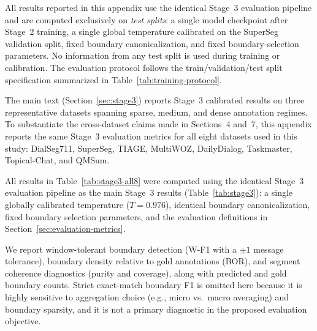 All results reported in this appendix use the identical Stage~3 evaluation pipeline
and are computed exclusively on \emph{test splits}:
a single model checkpoint after Stage~2 training,
a single global temperature calibrated on the SuperSeg validation split,
fixed boundary canonicalization,
and fixed boundary-selection parameters.
No information from any test split is used during training or calibration.
The evaluation protocol follows the train/validation/test split specification
summarized in Table~\ref{tab:training-protocol}.

The main text (Section~\ref{sec:stage3}) reports Stage~3 calibrated results on three
representative datasets spanning sparse, medium, and dense annotation
regimes. To substantiate the cross-dataset claims made in Sections~4 and~7,
this appendix reports the same Stage~3 evaluation
metrics for all eight datasets used in this study: DialSeg711,
SuperSeg, TIAGE, MultiWOZ, DailyDialog, Taskmaster,
Topical-Chat, and QMSum.

All results in Table~\ref{tab:stage3-all8} were computed using the
identical Stage~3 evaluation pipeline as the main Stage~3 results
(Table~\ref{tab:stage3}): a single globally calibrated temperature
($T=0.976$), identical boundary canonicalization, fixed boundary
selection parameters, and the evaluation definitions in Section~\ref{sec:evaluation-metrics}.

We report window-tolerant boundary detection (W-F1 with a $\pm 1$
message tolerance), boundary density relative to gold annotations
(BOR), and segment coherence diagnostics (purity and coverage), along
with predicted and gold boundary counts. Strict exact-match boundary
F1 is omitted here because it is highly sensitive to aggregation
choice (e.g., micro vs.\ macro averaging) and boundary sparsity, and
it is not a primary diagnostic in the proposed evaluation objective.

